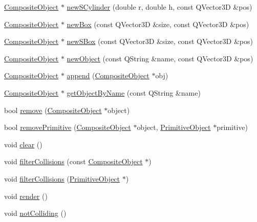 \begin{DoxyCompactItemize}
\hyperlink{class_robot_model_1_1_composite_object}{CompositeObject} $\ast$ \hyperlink{class_robot_model_1_1_world_a79ae7f54ffaaff409cc84352fabe71f5}{newSCylinder} (double r, double h, const QVector3D \&pos)
\item 
\hyperlink{class_robot_model_1_1_composite_object}{CompositeObject} $\ast$ \hyperlink{class_robot_model_1_1_world_a72a1de50cc6e30168aa642458cdb9c9e}{newBox} (const QVector3D \&size, const QVector3D \&pos)
\item 
\hyperlink{class_robot_model_1_1_composite_object}{CompositeObject} $\ast$ \hyperlink{class_robot_model_1_1_world_afc5192e95d3dfe41cef8a8122cfb0b1d}{newSBox} (const QVector3D \&size, const QVector3D \&pos)
\item 
\hyperlink{class_robot_model_1_1_composite_object}{CompositeObject} $\ast$ \hyperlink{class_robot_model_1_1_world_ab806377e96318c2e3e24a273ffc99cb2}{newObject} (const QString \&name, const QVector3D \&pos)
\item 
\hyperlink{class_robot_model_1_1_composite_object}{CompositeObject} $\ast$ \hyperlink{class_robot_model_1_1_world_a6ad866ebd6b662204d8b7b4d18dd3419}{append} (\hyperlink{class_robot_model_1_1_composite_object}{CompositeObject} $\ast$obj)
\item 
\hyperlink{class_robot_model_1_1_composite_object}{CompositeObject} $\ast$ \hyperlink{class_robot_model_1_1_world_a98d1508fb89f4b4edb2ad0bee04f490e}{getObjectByName} (const QString \&name)
\item 
bool \hyperlink{class_robot_model_1_1_world_a82de86617bf8c169eb12ef7369483303}{remove} (\hyperlink{class_robot_model_1_1_composite_object}{CompositeObject} $\ast$object)
\item 
bool \hyperlink{class_robot_model_1_1_world_a9bcebd1811fdc24fcc02ca64f37bcfaf}{removePrimitive} (\hyperlink{class_robot_model_1_1_composite_object}{CompositeObject} $\ast$object, \hyperlink{class_robot_model_1_1_primitive_object}{PrimitiveObject} $\ast$primitive)
\item 
void \hyperlink{class_robot_model_1_1_world_a3e85eb8061d927aebd233d800bdd68a8}{clear} ()
\item 
void \hyperlink{class_robot_model_1_1_world_a3d99274678676e8b0d762f0d58fb6501}{filterCollisions} (const \hyperlink{class_robot_model_1_1_composite_object}{CompositeObject} $\ast$)
\item 
void \hyperlink{class_robot_model_1_1_world_aefae9b6b622f835aeca5c5bf82e1dfc7}{filterCollisions} (\hyperlink{class_robot_model_1_1_primitive_object}{PrimitiveObject} $\ast$)
\item 
void \hyperlink{class_robot_model_1_1_world_a3a197c0bac0b3dbbdd73942a56168a29}{render} ()
\item 
void \hyperlink{class_robot_model_1_1_world_ac0ee5060cc743f6ffb991dc86dbff43e}{notColliding} ()
\end{DoxyCompactItemize}


